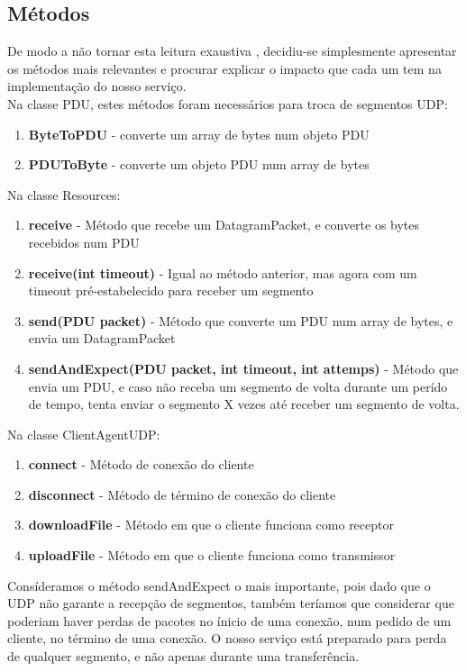 \documentclass{article}
\begin{document}
\subsection{Métodos}
De modo a não tornar esta leitura exaustiva , decidiu-se simplesmente apresentar os métodos mais relevantes
e procurar explicar o impacto que cada um tem na implementação do nosso serviço. \\
Na classe PDU, estes métodos foram necessários para troca de segmentos UDP:
\begin{enumerate}
\item \textbf{ByteToPDU} - converte um array de bytes num objeto PDU
\item \textbf{PDUToByte} - converte um objeto PDU num array de bytes
\end{enumerate}
Na classe Resources:
\begin{enumerate}
\item \textbf{receive} - Método que recebe um DatagramPacket, e converte os bytes recebidos num PDU
\item \textbf{receive(int timeout)} - Igual ao método anterior, mas agora com um timeout pré-estabelecido para receber um segmento
\item \textbf{send(PDU packet)} - Método que converte um PDU num array de bytes, e envia um DatagramPacket
\item \textbf{sendAndExpect(PDU packet, int timeout, int attemps)} - Método que envia um PDU, e caso não receba um segmento de volta durante um perído de tempo, tenta enviar o segmento X vezes até receber um segmento de volta.
\end{enumerate}
Na classe ClientAgentUDP:
\begin{enumerate}
\item \textbf{connect} - Método de conexão do cliente
\item \textbf{disconnect} -  Método de término de conexão do cliente
\item \textbf{downloadFile} - Método em que o cliente funciona como receptor
\item \textbf{uploadFile} - Método em que o cliente funciona como transmissor
\end{enumerate}

Consíderamos o método sendAndExpect o mais importante, pois dado que o UDP não garante a recepção de segmentos, também teríamos que considerar
que poderiam haver perdas de pacotes no ínicio de uma conexão, num pedido de um cliente, no término de uma conexão. O nosso serviço
está preparado para perda de qualquer segmento, e não apenas durante uma transferência. 
\end{document}
